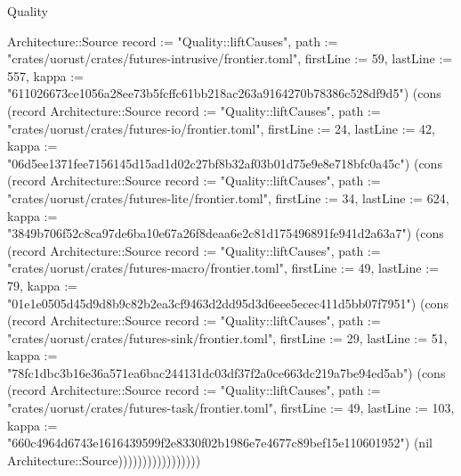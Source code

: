 \begin{lexlean}{Quality}
\begin{semanticmodule}
{Architecture::Source {record := "Quality::liftCauses", path := "crates/uorust/crates/futures-intrusive/frontier.toml", firstLine := 59, lastLine := 557, kappa := "611026673ce1056a28ee73b5fcffc61bb218ac263a9164270b78386c528df9d5"}) (cons (record Architecture::Source {record := "Quality::liftCauses", path := "crates/uorust/crates/futures-io/frontier.toml", firstLine := 24, lastLine := 42, kappa := "06d5ee1371fee7156145d15ad1d02c27bf8b32af03b01d75e9e8e718bfc0a45c"}) (cons (record Architecture::Source {record := "Quality::liftCauses", path := "crates/uorust/crates/futures-lite/frontier.toml", firstLine := 34, lastLine := 624, kappa := "3849b706f52c8ca97de6ba10e67a26f8deaa6e2c81d175496891fe941d2a63a7"}) (cons (record Architecture::Source {record := "Quality::liftCauses", path := "crates/uorust/crates/futures-macro/frontier.toml", firstLine := 49, lastLine := 79, kappa := "01e1e0505d45d9d8b9c82b2ea3cf9463d2dd95d3d6eee5ecec411d5bb07f7951"}) (cons (record Architecture::Source {record := "Quality::liftCauses", path := "crates/uorust/crates/futures-sink/frontier.toml", firstLine := 29, lastLine := 51, kappa := "78fc1dbc3b16e36a571ea6bac244131dc03df37f2a0ce663dc219a7be94ed5ab"}) (cons (record Architecture::Source {record := "Quality::liftCauses", path := "crates/uorust/crates/futures-task/frontier.toml", firstLine := 49, lastLine := 103, kappa := "660c4964d6743e1616439599f2e8330f02b1986e7e4677c89bef15e110601952"}) (nil Architecture::Source)))))))))))))))))
}


\end{semanticmodule}
\end{lexlean}
